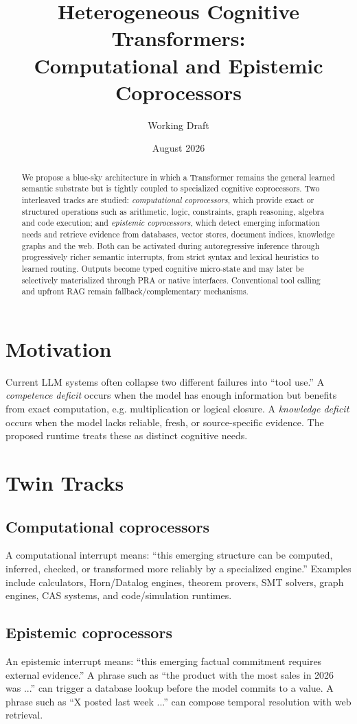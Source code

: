 \documentclass[11pt]{article}
\title{Heterogeneous Cognitive Transformers:\\Computational and Epistemic Coprocessors}
\author{Working Draft}\date{August 2026}
\begin{document}
\maketitle
\begin{abstract}
We propose a blue-sky architecture in which a Transformer remains the general learned semantic substrate but is tightly coupled to specialized cognitive coprocessors. Two interleaved tracks are studied: \emph{computational coprocessors}, which provide exact or structured operations such as arithmetic, logic, constraints, graph reasoning, algebra and code execution; and \emph{epistemic coprocessors}, which detect emerging information needs and retrieve evidence from databases, vector stores, document indices, knowledge graphs and the web. Both can be activated during autoregressive inference through progressively richer semantic interrupts, from strict syntax and lexical heuristics to learned routing. Outputs become typed cognitive micro-state and may later be selectively materialized through PRA or native interfaces. Conventional tool calling and upfront RAG remain fallback/complementary mechanisms.
\end{abstract}

\section{Motivation}
Current LLM systems often collapse two different failures into ``tool use.'' A \emph{competence deficit} occurs when the model has enough information but benefits from exact computation, e.g. multiplication or logical closure. A \emph{knowledge deficit} occurs when the model lacks reliable, fresh, or source-specific evidence. The proposed runtime treats these as distinct cognitive needs.

\section{Twin Tracks}
\subsection{Computational coprocessors}
A computational interrupt means: ``this emerging structure can be computed, inferred, checked, or transformed more reliably by a specialized engine.'' Examples include calculators, Horn/Datalog engines, theorem provers, SMT solvers, graph engines, CAS systems, and code/simulation runtimes.

\subsection{Epistemic coprocessors}
An epistemic interrupt means: ``this emerging factual commitment requires external evidence.'' A phrase such as ``the product with the most sales in 2026 was ...'' can trigger a database lookup before the model commits to a value. A phrase such as ``X posted last week ...'' can compose temporal resolution with web retrieval.
\end{document}
